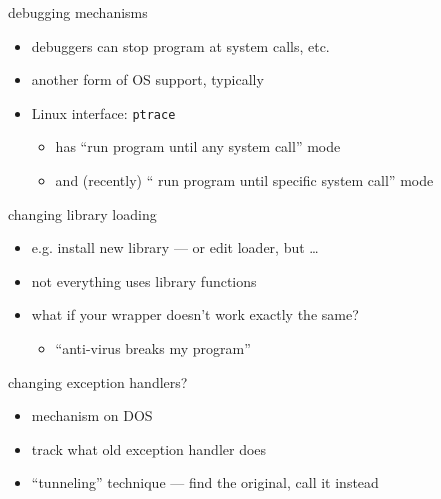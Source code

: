 \begin{frame}{debugging mechanisms}
    \begin{itemize}
    \item debuggers can stop program at system calls, etc.
    \item another form of OS support, typically
    \item Linux interface: {\tt ptrace}
        \begin{itemize}
        \item has ``run program until any system call'' mode
        \item and (recently) `` run program until specific system call'' mode
        \end{itemize}
    \end{itemize}
\end{frame}


\begin{frame}{changing library loading}
\begin{itemize}
    \item e.g. install new library --- or edit loader, but \ldots
    \vspace{.5cm}
    \item not everything uses library functions
    \item what if your wrapper doesn't work exactly the same?
        \begin{itemize}
        \item ``anti-virus breaks my program''
        \end{itemize}
    \end{itemize}
\end{frame}


\begin{frame}{changing exception handlers?}
    \begin{itemize}
    \item mechanism on DOS
    \item track what old exception handler does
    \item ``tunneling'' technique --- find the original, call it instead
    \end{itemize}
\end{frame}

